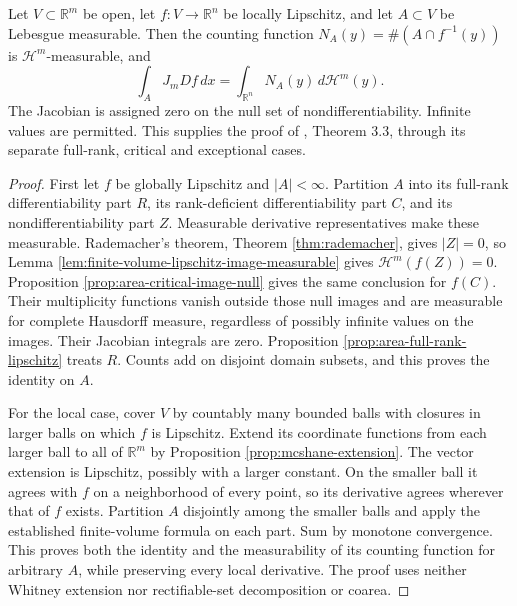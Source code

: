 \begin{theorem}\label{thm:euclidean-area-local-proof}
Let $V\subset\mathbb R^m$ be open, let $f:V\to\mathbb R^n$ be locally Lipschitz, and let $A\subset V$ be Lebesgue measurable. Then the counting function $N_A(y)=\#(A\cap f^{-1}(y))$ is $\mathcal H^m$-measurable, and
\[
 \int_AJ_mDf\,dx=\int_{\mathbb R^n}N_A(y)\,d\mathcal H^m(y).
\]
The Jacobian is assigned zero on the null set of nondifferentiability. Infinite values are permitted. This supplies the proof of \cite{Sim18}, Theorem 3.3, through its separate full-rank, critical and exceptional cases.
\end{theorem}
\begin{proof}
First let $f$ be globally Lipschitz and $|A|<\infty$. Partition $A$ into its full-rank differentiability part $R$, its rank-deficient differentiability part $C$, and its nondifferentiability part $Z$. Measurable derivative representatives make these measurable. Rademacher's theorem, Theorem \ref{thm:rademacher}, gives $|Z|=0$, so Lemma \ref{lem:finite-volume-lipschitz-image-measurable} gives $\mathcal H^m(f(Z))=0$. Proposition \ref{prop:area-critical-image-null} gives the same conclusion for $f(C)$. Their multiplicity functions vanish outside those null images and are measurable for complete Hausdorff measure, regardless of possibly infinite values on the images. Their Jacobian integrals are zero. Proposition \ref{prop:area-full-rank-lipschitz} treats $R$. Counts add on disjoint domain subsets, and this proves the identity on $A$.

For the local case, cover $V$ by countably many bounded balls with closures in larger balls on which $f$ is Lipschitz. Extend its coordinate functions from each larger ball to all of $\mathbb R^m$ by Proposition \ref{prop:mcshane-extension}. The vector extension is Lipschitz, possibly with a larger constant. On the smaller ball it agrees with $f$ on a neighborhood of every point, so its derivative agrees wherever that of $f$ exists. Partition $A$ disjointly among the smaller balls and apply the established finite-volume formula on each part. Sum by monotone convergence. This proves both the identity and the measurability of its counting function for arbitrary $A$, while preserving every local derivative. The proof uses neither Whitney extension nor rectifiable-set decomposition or coarea.
\end{proof}

